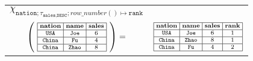 \noindent \begin{tabular}{@{}c@{~~}c@{}}
    $\chi_{\texttt{nation}; \tau_{\texttt{sales}, \texttt{DESC}} ; row\_number() \mapsto \texttt{rank}}$\\
		$
    \left(~
    \begin{scriptsize}
    \begin{array}{|@{~}c@{~}|@{~}c@{~}|@{~}c@{~}|}
    \hline
    \textbf{nation} & \textbf{name} & \textbf{sales} \\ \hline
    \texttt{USA} & \texttt{Joe} & 6 \\ \hline
    \texttt{China} & \texttt{Fu} & 4 \\ \hline
    \texttt{China} & \texttt{Zhao} & 8 \\ \hline 
    \end{array}
    \end{scriptsize}
    ~\right)
    =$
&
    $\begin{scriptsize}
    \begin{array}{|@{~}c@{~}|@{~}c@{~}|@{~}c@{~}|@{~}c@{~}|}
    \hline
    \textbf{nation} & \textbf{name} & \textbf{sales} & \textbf{rank} \\ \hline
    \texttt{USA} & \texttt{Joe} & 6 & 1 \\ \hline
    \texttt{China} & \texttt{Zhao} & 8 & 1\\ \hline
    \texttt{China} & \texttt{Fu} & 4 & 2\\ \hline
    \end{array}
    \end{scriptsize}
    $
\\
\end{tabular}\\